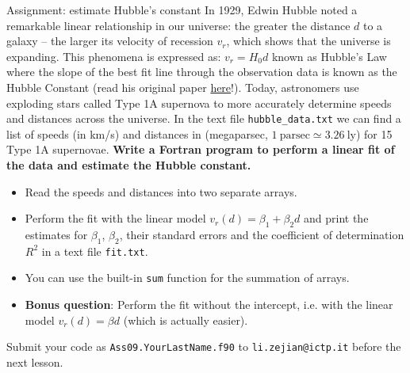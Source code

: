 \documentclass[10pt,aspectratio=169,handout]{beamer}
\begin{document}
\begin{frame}{Assignment: estimate Hubble's constant}
	In 1929, Edwin Hubble noted a remarkable linear relationship in our universe: the greater the distance $d$ to a galaxy – the larger its velocity of recession $v_r$, which shows that the universe is expanding. This phenomena is expressed as:
	$ v_r = H_0 d $
	known as Hubble’s Law where the slope of the best fit line through the observation data is known as the Hubble Constant (read his original paper \href{https://www.pnas.org/doi/10.1073/pnas.15.3.168}{here}!). Today, astronomers use exploding stars called Type 1A supernova to more accurately determine speeds and distances across the universe. In the text file \texttt{hubble\_data.txt} we can find a list of speeds (in km/s) and distances in (megaparsec, $1~\mathrm{parsec} \simeq 3.26~\mathrm{ly}$) for 15 Type 1A supernovae. \textbf{Write a Fortran program to perform a linear fit of the data and estimate the Hubble constant.}\\ \pause
	\begin{itemize}[<+->]
		\item Read the speeds and distances into two separate arrays.
		\item Perform the fit with the linear model $ v_r(d) = \beta_1+\beta_2 d$ and print the estimates for $\beta_1$, $\beta_2$, their standard errors and the coefficient of determination $R^2$ in a text file \texttt{fit.txt}.
		\item You can use the built-in \texttt{sum} function for the summation of arrays.
		\item 	\textbf{Bonus question}: Perform the fit without the intercept, i.e. with the linear model $v_r(d) = \beta d$ (which is actually easier).
	\end{itemize}
Submit your code as \texttt{Ass09.YourLastName.f90} to \texttt{li.zejian@ictp.it} before the next lesson.
\end{frame}

\end{document}
